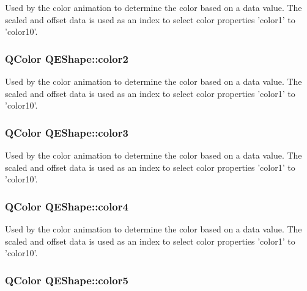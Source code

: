 \label{classQEShape_a4f5c3588b67f1a3d5e13b96b1d80a128}
Used by the color animation to determine the color based on a data value. The scaled and offset data is used as an index to select color properties 'color1' to 'color10'. \hypertarget{classQEShape_ad8675dd4a120598ed1ec2f50865be077}{
\subsubsection[{color2}]{\setlength{\rightskip}{0pt plus 5cm}QColor QEShape::color2}}
\label{classQEShape_ad8675dd4a120598ed1ec2f50865be077}
Used by the color animation to determine the color based on a data value. The scaled and offset data is used as an index to select color properties 'color1' to 'color10'. \hypertarget{classQEShape_a663e1f40fefc23971da89554242c8343}{
\subsubsection[{color3}]{\setlength{\rightskip}{0pt plus 5cm}QColor QEShape::color3}}
\label{classQEShape_a663e1f40fefc23971da89554242c8343}
Used by the color animation to determine the color based on a data value. The scaled and offset data is used as an index to select color properties 'color1' to 'color10'. \hypertarget{classQEShape_a74e07320c37ad47f5dda20016385ae6d}{
\subsubsection[{color4}]{\setlength{\rightskip}{0pt plus 5cm}QColor QEShape::color4}}
\label{classQEShape_a74e07320c37ad47f5dda20016385ae6d}
Used by the color animation to determine the color based on a data value. The scaled and offset data is used as an index to select color properties 'color1' to 'color10'. \hypertarget{classQEShape_ad8a11f05889b2a64719a4e74e29a2714}{
\subsubsection[{color5}]{\setlength{\rightskip}{0pt plus 5cm}QColor QEShape::color5}}
